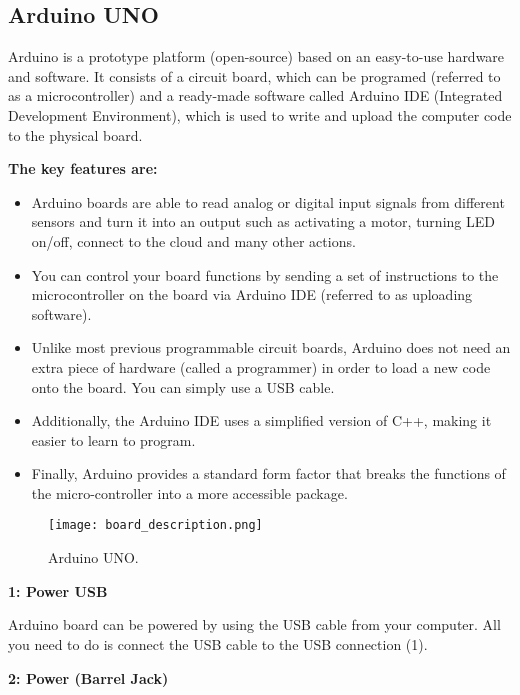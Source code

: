 \pagebreak
\subsection{Arduino UNO}
Arduino is a prototype platform (open-source) based on an easy-to-use hardware and software. It consists of a circuit board, which can be programed (referred to as a microcontroller) and a ready-made software called Arduino IDE (Integrated Development Environment), which is used to write and upload the computer code to the physical board.\vspace{.3cm}

\textbf{The key features are: }
\begin{itemize}
	\item Arduino boards are able to read analog or digital input signals from different sensors and turn it into an output such as activating a motor, turning LED on/off, connect to the cloud and many other actions.
	
	\item You can control your board functions by sending a set of instructions to the microcontroller on the board via Arduino IDE (referred to as uploading software).
	
	\item Unlike most previous programmable circuit boards, Arduino does not need an extra piece of hardware (called a programmer) in order to load a new code onto the board. You can simply use a USB cable.
	
	\item Additionally, the Arduino IDE uses a simplified version of C++, making it easier to learn to program.
	
	\item Finally, Arduino provides a standard form factor that breaks the functions of the micro-controller into a more accessible package.
\end{itemize}
\begin{figure}[h]
	\centering
	\texttt{[image: board\_description.png]}
	\caption{Arduino UNO.}
\end{figure}

\textbf{1: Power USB}\vspace{.3cm}

Arduino board can be powered by using the USB cable from your computer. All you need to do is connect the USB cable to the USB connection (1).\vspace{.3cm}

\textbf{2: Power (Barrel Jack)}\vspace{.3cm}

